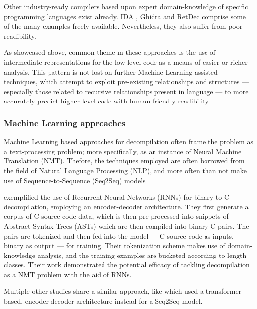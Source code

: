 \documentclass[../main.tex]{subfiles}
\begin{document}
Other industry-ready compilers based upon expert domain-knowledge of specific 
programming languages exist already. IDA \cite{hexrays}, Ghidra \cite{ghidra}
and RetDec \cite{retdec} comprise some of the many examples freely-available. 
Nevertheless, they also suffer from poor readibility.

As showcased above, common theme in these approaches is the use of intermediate 
representations for the low-level code as a means of easier or richer analysis.
This pattern is not lost on further Machine Learning assisted techniques, which
attempt to exploit pre-existing relationships and structures — especially those
related to recursive relationships present in language — to more accurately
predict higher-level code with human-friendly readibility.

\subsubsection{Machine Learning approaches}

Machine Learning based approaches for decompilation often frame the problem as a 
text-processing problem; more specifically, as an instance of Neural Machine 
Translation (NMT). Thefore, the techniques employed are often borrowed from the
field of Natural Language Processing (NLP), and more often than not make use of
Sequence-to-Sequence (Seq2Seq) models \cite{DBLP:journals/corr/SutskeverVL14}

\cite{katz_using_2018} exemplified the use of Recurrent Neural Networks (RNNs) for 
binary-to-C decompilation, employing an encoder-decoder architecture. They first 
generate a corpus of C source-code data, which is then pre-processed into snippets
of Abstract Syntax Trees (ASTs) which are then compiled into binary-C pairs. The
pairs are tokenized and then fed into the model — C source code as inputs, binary 
as output — for training. Their tokenization scheme makes use of domain-knowledge 
analysis, and the training examples are bucketed according to length classes.
Their work demonstrated the potential efficacy of tackling decompilation as a NMT 
problem with the aid of RNNs. 

Multiple other studies share a similar approach, like \cite{hosseini_beyond_2022} 
which used a transformer-based, encoder-decoder architecture instead for a Seq2Seq
model.
\end{document}
